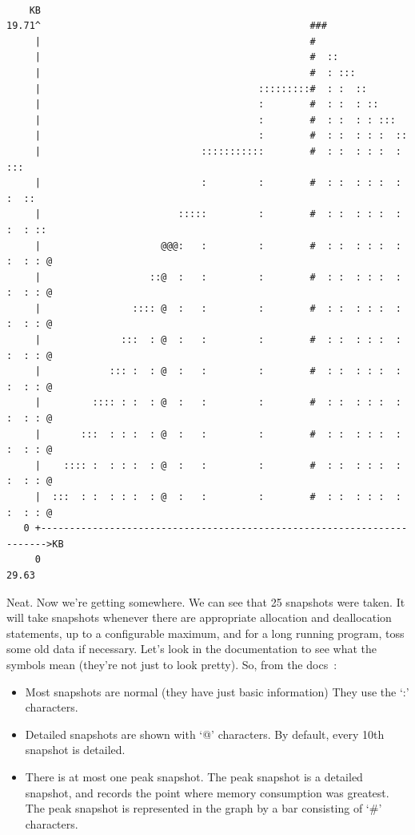\documentclass[a4paper]{report}
\begin{document}
{\scriptsize
\begin{verbatim}

    KB
19.71^                                               ###                      
     |                                               #                        
     |                                               #  ::                    
     |                                               #  : :::                 
     |                                      :::::::::#  : :  ::               
     |                                      :        #  : :  : ::             
     |                                      :        #  : :  : : :::          
     |                                      :        #  : :  : : :  ::        
     |                            :::::::::::        #  : :  : : :  : :::     
     |                            :         :        #  : :  : : :  : :  ::   
     |                        :::::         :        #  : :  : : :  : :  : :: 
     |                     @@@:   :         :        #  : :  : : :  : :  : : @
     |                   ::@  :   :         :        #  : :  : : :  : :  : : @
     |                :::: @  :   :         :        #  : :  : : :  : :  : : @
     |              :::  : @  :   :         :        #  : :  : : :  : :  : : @
     |            ::: :  : @  :   :         :        #  : :  : : :  : :  : : @
     |         :::: : :  : @  :   :         :        #  : :  : : :  : :  : : @
     |       :::  : : :  : @  :   :         :        #  : :  : : :  : :  : : @
     |    :::: :  : : :  : @  :   :         :        #  : :  : : :  : :  : : @
     |  :::  : :  : : :  : @  :   :         :        #  : :  : : :  : :  : : @
   0 +----------------------------------------------------------------------->KB
     0                                                                   29.63

\end{verbatim}
}

Neat. Now we're getting somewhere. We can see that 25 snapshots were taken. It will take snapshots whenever there are appropriate allocation and deallocation statements, up to a configurable maximum, and for a long running program, toss some old data if necessary. Let's look in the documentation to see what the symbols mean (they're not just to look pretty). So, from the docs~\cite{massif}:

\begin{itemize}
\item Most snapshots are normal (they have just basic information) They use the `:' characters.

\item Detailed snapshots are shown with `@' characters.  By default, every 10th snapshot is detailed.

\item There is at most one peak snapshot. The peak snapshot is a detailed snapshot, and records the point where memory consumption was greatest. The peak snapshot is represented in the graph by a bar consisting of `\#' characters.
\end{itemize}
\end{document}
